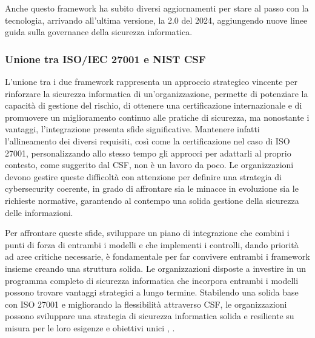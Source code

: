         Anche questo framework ha subito diversi aggiornamenti per stare al passo con la tecnologia, arrivando all'ultima versione, la 2.0 del 2024, aggiungendo nuove linee guida sulla governance della sicurezza informatica.

        \subsubsection{Unione tra ISO/IEC 27001 e NIST CSF}
        L'unione tra i due framework rappresenta un approccio strategico vincente per rinforzare la sicurezza informatica di un'organizzazione, permette di potenziare la capacità di gestione del rischio, di ottenere una certificazione internazionale e di promuovere un miglioramento continuo alle pratiche di sicurezza, ma nonostante i vantaggi, l'integrazione presenta sfide significative.
        Mantenere infatti l'allineamento dei diversi requisiti, così come la certificazione nel caso di ISO 27001, personalizzando allo stesso tempo gli approcci per adattarli al proprio contesto, come suggerito dal CSF, non è un lavoro da poco.
        Le organizzazioni devono gestire queste difficoltà con attenzione per definire una strategia di cybersecurity coerente, in grado di affrontare sia le minacce in evoluzione sia le richieste normative, garantendo al contempo una solida gestione della sicurezza delle informazioni.
        
        Per affrontare queste sfide, sviluppare un piano di integrazione che combini i punti di forza di entrambi i modelli e che implementi i controlli, dando priorità ad aree critiche necessarie, è fondamentale per far convivere entrambi i framework insieme creando una struttura solida.
        Le organizzazioni disposte a investire in un programma completo di sicurezza informatica che incorpora entrambi i modelli possono trovare vantaggi strategici a lungo termine. Stabilendo una solida base con ISO 27001 e migliorando la flessibilità attraverso CSF, le organizzazioni possono sviluppare una strategia di sicurezza informatica solida e resiliente su misura per le loro esigenze e obiettivi unici \cite{linkedin_iso_csf}, \cite{Comparison_CSF_ISO}.

